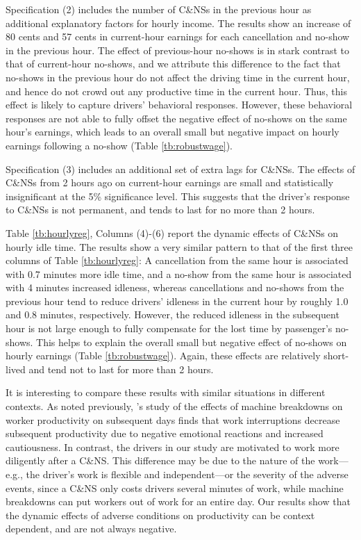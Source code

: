 \documentclass[reviewmode]{restud}
\begin{document}
Specification (2) includes the number of C\&NSs in the previous hour as additional explanatory factors for hourly income. The results show an increase of 80 cents and 57 cents in current-hour earnings for each cancellation and no-show in the previous hour. The effect of previous-hour no-shows is in stark contrast to that of current-hour no-shows, and we attribute this difference to the fact that no-shows in the previous hour do not affect the driving time in the current hour, and hence do not crowd out any productive time in the current hour. Thus, this effect is likely to capture drivers' behavioral responses. However, these behavioral responses are not able to fully offset the negative effect of no-shows on the same hour's earnings, which leads to an overall small but negative impact on hourly earnings following a no-show (Table \ref{tb:robustwage}).

Specification (3) includes an additional set of extra lags for C\&NSs. The effects of C\&NSs from 2 hours ago on current-hour earnings are small and statistically insignificant at the 5\% significance level. This suggests that the driver's response to C\&NSs is not permanent, and tends to last for no more than 2 hours.

Table \ref{tb:hourlyreg}, Columns (4)-(6) report the dynamic effects of C\&NSs on hourly idle time. The results show a very similar pattern to that of the first three columns of Table \ref{tb:hourlyreg}: A cancellation from the same hour is associated with 0.7 minutes more idle time, and a no-show from the same hour is associated with 4 minutes increased idleness, whereas cancellations and no-shows from the previous hour tend to reduce drivers' idleness in the current hour by roughly 1.0 and 0.8 minutes, respectively. However, the reduced idleness in the subsequent hour is not large enough to fully compensate for the lost time by passenger's no-shows. This helps to explain the overall small but negative effect of no-shows on hourly earnings (Table \ref{tb:robustwage}).  Again, these effects are relatively short-lived and tend not to last for more than 2 hours.

It is interesting to compare these results with similar situations in different contexts. As noted previously, \citeauthor{cai2017recover}'s \citeyear{cai2017recover} study of the effects of  machine breakdowns on worker productivity on subsequent days finds that work interruptions decrease subsequent productivity due to negative emotional reactions and increased cautiousness. In contrast, the drivers in our study are motivated to work more diligently after a C\&NS. This difference may be due to the nature of the work---e.g., the driver's work is flexible and independent---or the severity of the adverse events, since a C\&NS only costs drivers several minutes of work, while machine breakdowns can put workers out of work for an entire day. Our results show that the dynamic effects of adverse conditions on productivity can be context dependent, and are not always negative.
\end{document}
